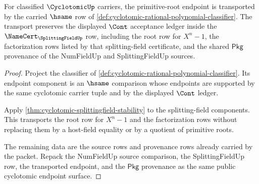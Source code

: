 \begin{theorem}
\label{thm:cyclotomic-primitive-root-endpoint-transport}
For classified $\CyclotomicUp$ carriers, the primitive-root endpoint is transported by the carried $\hsame$ row of \autoref{def:cyclotomic-rational-polynomial-classifier}. The transport preserves the displayed $\Cont$ acceptance ledger inside the $\NameCert_{\SplittingFieldUp}$ row, including the root row for $X^n-1$, the factorization rows listed by that splitting-field certificate, and the shared $\mathsf{Pkg}$ provenance of the NumFieldUp and SplittingFieldUp sources.
\end{theorem}
\begin{proof}
Project the classifier of \autoref{def:cyclotomic-rational-polynomial-classifier}. Its endpoint component is an $\hsame$ comparison whose endpoints are supported by the same cyclotomic carrier tuple and by the displayed $\Cont$ ledger.

Apply \autoref{thm:cyclotomic-splittingfield-stability} to the splitting-field components. This transports the root row for $X^n-1$ and the factorization rows without replacing them by a host-field equality or by a quotient of primitive roots.

The remaining data are the source rows and provenance rows already carried by the packet. Repack the NumFieldUp source comparison, the SplittingFieldUp row, the transported endpoint, and the $\mathsf{Pkg}$ provenance as the same public cyclotomic endpoint surface.
\end{proof}


